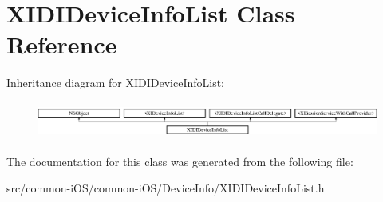 \hypertarget{interface_x_i_d_i_device_info_list}{}\section{X\+I\+D\+I\+Device\+Info\+List Class Reference}
\label{interface_x_i_d_i_device_info_list}
Inheritance diagram for X\+I\+D\+I\+Device\+Info\+List\+:\begin{figure}[H]
\begin{center}
\leavevmode
\includegraphics[height=1.222707cm]{interface_x_i_d_i_device_info_list}
\end{center}
\end{figure}


The documentation for this class was generated from the following file\+:\begin{DoxyCompactItemize}
\item 
src/common-\/i\+O\+S/common-\/i\+O\+S/\+Device\+Info/X\+I\+D\+I\+Device\+Info\+List.\+h\end{DoxyCompactItemize}
